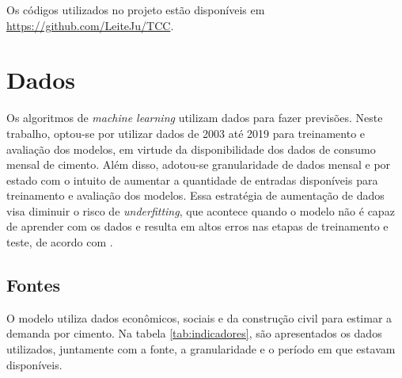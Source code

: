 Os códigos utilizados no projeto estão disponíveis em \url{https://github.com/LeiteJu/TCC}.

\section{Dados}
\label{sec:dados}

Os algoritmos de \textit{machine learning} utilizam dados para fazer 
previsões. 
Neste trabalho, optou-se por utilizar dados de 2003 até 2019 para treinamento e 
avaliação dos modelos, em virtude da disponibilidade dos dados de consumo mensal 
de cimento. Além disso,
adotou-se granularidade de dados
mensal e por estado com o intuito de aumentar a quantidade de entradas disponíveis 
para treinamento e avaliação dos modelos.
Essa estratégia de aumentação de dados visa diminuir o risco de  
\textit{underfitting}, que acontece quando o 
modelo não é capaz de aprender com os dados e resulta em altos erros nas etapas de
treinamento e teste, de acordo com \citet{Goodfellow-et-al-2016}.


\subsection{Fontes}

O modelo utiliza dados econômicos, sociais e da construção
civil para estimar a demanda por cimento. Na tabela
\ref{tab:indicadores}, são
apresentados os dados utilizados, juntamente com a fonte, a granularidade 
e o período em que estavam disponíveis.


